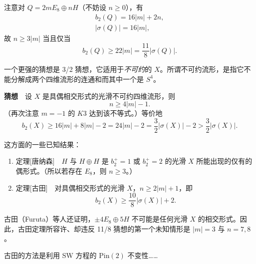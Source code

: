 注意对 $Q=2mE_{8}\oplus nH$（不妨设 $n\ge0$），有
\begin{equation}
\begin{gathered}
b_{2}(Q)=16|m|+2n,\\
|\sigma(Q)|=16|m|,
\end{gathered}
\tag{B.4}
\end{equation}
故 $n\ge3|m|$ 当且仅当
\begin{equation}
b_{2}(Q)\ge22|m|=\frac{11}{8}|\sigma(Q)|.
\tag{B.5}
\end{equation}

一个更强的猜想是 3/2 猜想，它适用于\emph{不可约}的 $X$。所谓不可约流形，是指它不能分解成两个四维流形的连通和而其中一个是 $S^{4}$。

\medskip
\noindent\textbf{猜想}　设 $X$ 是具偶相交形式的光滑不可约四维流形，则
\begin{equation}
n\ge4|m|-1.
\tag{B.6}
\end{equation}
（再次注意 $m=-1$ 的 $K3$ 达到该不等式。）等价地
\begin{equation}
b_{2}(X)\ge16|m|+8|m|-2=24|m|-2
=\frac{3}{2}|\sigma(X)|-2>\frac{3}{2}|\sigma(X)|.
\tag{B.7}
\end{equation}

这方面的一些已知结果：
\begin{enumerate}[label=\arabic*., leftmargin=2.1em]
\item 定理[唐纳森]　$H$ 与 $H\oplus H$ 是 $b_{2}^{+}=1$ 或 $b_{2}^{+}=2$ 的光滑 $X$ 所能出现的仅有的偶形式。（所以若存在 $E_{8}$，则 $n\ge3$。）
\item 定理[古田]　对具偶相交形式的光滑 $X$，$n\ge2|m|+1$，即
\begin{equation}
b_{2}(X)\ge\frac{10}{8}|\sigma(X)|+2.
\tag{B.8}
\end{equation}
\end{enumerate}

古田（Furuta）等人还证明，$\pm4E_{8}\oplus5H$ 不可能是任何光滑 $X$ 的相交形式。因此，古田定理所容许、却违反 11/8 猜想的第一个未知情形是 $|m|=3$ 与 $n=7,8$。

古田的方法是利用 SW 方程的 $\mathrm{Pin}(2)$ 不变性……


